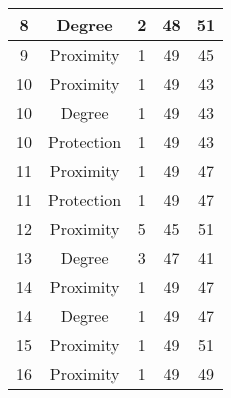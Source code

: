 \documentclass[results.tex]{subfiles}
\begin{document}
\begin{center}
\begin{tabular}{| c || c | c | c | c |}
            \hline
            8                       & Degree                       & 2                      & 48                      & 51                   \\
            \hline
            9                       & Proximity                    & 1                      & 49                      & 45                   \\
            \hline
            10                      & Proximity                    & 1                      & 49                      & 43                   \\
            \hline
            10                      & Degree                       & 1                      & 49                      & 43                   \\
            \hline
            10                      & Protection                   & 1                      & 49                      & 43                   \\
            \hline
            11                      & Proximity                    & 1                      & 49                      & 47                   \\
            \hline
            11                      & Protection                   & 1                      & 49                      & 47                   \\
            \hline
            12                      & Proximity                    & 5                      & 45                      & 51                   \\
            \hline
            13                      & Degree                       & 3                      & 47                      & 41                   \\
            \hline
            14                      & Proximity                    & 1                      & 49                      & 47                   \\
            \hline
            14                      & Degree                       & 1                      & 49                      & 47                   \\
            \hline
            15                      & Proximity                    & 1                      & 49                      & 51                   \\
            \hline
            16                      & Proximity                    & 1                      & 49                      & 49                   \\

\end{tabular}
\end{center}
\end{document}
